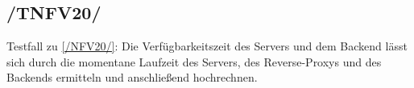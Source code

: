 \subsection*{/TNFV20/}

\label{/TNFV20/} Testfall zu \ref{/NFV20/}: Die Verfügbarkeitszeit des \Gls{Server}s und dem \Gls{Backend} lässt sich durch die momentane Laufzeit des \Gls{Server}s,
des \Gls{Reverse-Proxy}s und des \Gls{Backend}s ermitteln und anschließend hochrechnen.